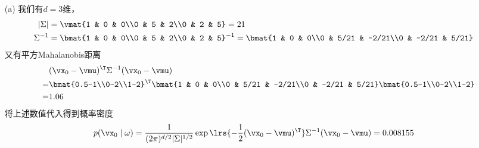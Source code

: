 \documentclass[reportComp]{thesis}
\begin{document}
\begin{answer}
\begin{itemize}
	\item [(a)] 我们有$d=3$维，
	\[\begin{aligned}
	|\Sigma|&=\vmat{1 & 0 & 0\\0 & 5 & 2\\0 & 2 & 5}=21\\
	\Sigma^{-1}&=\bmat{1 & 0 & 0\\0 & 5 & 2\\0 & 2 & 5}^{-1}=\bmat{1 & 0 & 0\\0 & 5/21 & -2/21\\0 & -2/21 & 5/21}
	\end{aligned}\]
	又有平方Mahalanobis距离
	\[\begin{aligned}
	\qquad&(\vx_0-\vmu)^\T\Sigma^{-1}(\vx_0-\vmu)\\
	=&\bmat{0.5-1\\0-2\\1-2}^\T\bmat{1 & 0 & 0\\0 & 5/21 & -2/21\\0 & -2/21 & 5/21}\bmat{0.5-1\\0-2\\1-2}\\
	=& 1.06
	\end{aligned}\]
	将上述数值代入得到概率密度
	\[p(\vx_0\mid\omega)=\frac{1}{(2\pi)^{d/2}|\Sigma|^{1/2}}\exp\lrs{-\frac{1}{2}(\vx_0-\vmu)^\T}\Sigma^{-1}(\vx_0-\vmu)=0.008155\]


\end{itemize}
\end{answer}
\end{document}
